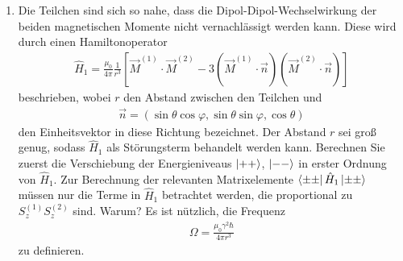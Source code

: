 \documentclass[11pt,a4paper]{scrartcl}
\newcommand{\op}[1]{\hat{#1}}
\begin{document}
\begin{enumerate}[label=(\alph*)]
\begin{calculationbox}
\begin{calculationbox}[title=Energieeigenwerte]
                \begin{solutionbox}[title=Ungestörtes Spektrum]
                    \begin{align*}
                        E_{++}^{(0)}=-\hbar\omega_0,
                        \qquad
                        E_{+-}^{(0)}=0,
                        \qquad
                        E_{-+}^{(0)}=0,
                        \qquad
                        E_{--}^{(0)}=+\hbar\omega_0.
                    \end{align*}
                \end{solutionbox}
                Das Niveau $E=0$ ist zweifach entartet, weil die Zustände $\ket{+-}$ und $\ket{-+}$ dieselbe Energie besitzen.
            \end{calculationbox}
        \end{calculationbox}

        \item Die Teilchen sind sich so nahe, dass die Dipol-Dipol-Wechselwirkung der beiden magnetischen Momente nicht vernachlässigt werden kann. Diese wird durch einen Hamiltonoperator
        \begin{align*}
            \op H_1
            =
            \frac{\mu_0}{4\pi}\frac{1}{r^3}
            \left[
                \vec M^{(1)}\cdot \vec M^{(2)}
                -3(\vec M^{(1)}\cdot\vec n)(\vec M^{(2)}\cdot\vec n)
            \right]
        \end{align*}
        beschrieben, wobei $r$ den Abstand zwischen den Teilchen und
        \begin{align*}
            \vec n=(\sin\theta\cos\varphi,\sin\theta\sin\varphi,\cos\theta)
        \end{align*}
        den Einheitsvektor in diese Richtung bezeichnet. Der Abstand $r$ sei groß genug, sodass $\op H_1$ als Störungsterm behandelt werden kann. Berechnen Sie zuerst die Verschiebung der Energieniveaus $\ket{++}$, $\ket{--}$ in erster Ordnung von $\op H_1$. Zur Berechnung der relevanten Matrixelemente $\bra{\pm\pm}\op H_1\ket{\pm\pm}$ müssen nur die Terme in $\op H_1$ betrachtet werden, die proportional zu $S_z^{(1)}S_z^{(2)}$ sind. Warum? Es ist nützlich, die Frequenz
        \begin{align*}
            \Omega=\frac{\mu_0\gamma^2\hbar}{4\pi r^3}
        \end{align*}
        zu definieren.


\end{enumerate}
\end{document}
